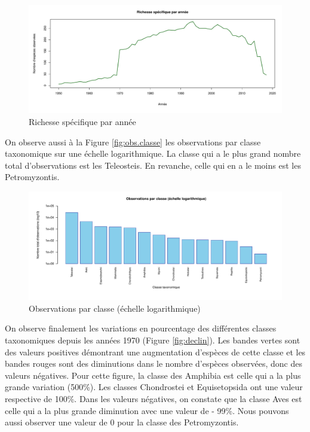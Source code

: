 \documentclass[9pt,twocolumn,twoside,]{pnas-new}
\begin{document}
\begin{figure}
\includegraphics[width=1\linewidth]{../figure_1_esp_par_annee} \caption{\label{fig:esp.annee} Richesse spécifique par année}\label{fig:fig.esp.annee}
\end{figure}

On observe aussi à la Figure \ref{fig:obs.classe} les observations par
classe taxonomique sur une échelle logarithmique. La classe qui a le
plus grand nombre total d'observations est les Teleosteis. En revanche,
celle qui en a le moins est les Petromyzontis.

\begin{figure}
\includegraphics[width=1\linewidth]{../figure_2_obs_par_classe} \caption{\label{fig:obs.classe} Observations par classe (échelle logarithmique)}\label{fig:fig.obs.classe}
\end{figure}

On observe finalement les variations en pourcentage des différentes
classes taxonomiques depuis les années 1970 (Figure \ref{fig:declin}).
Les bandes vertes sont des valeurs positives démontrant une augmentation
d'espèces de cette classe et les bandes rouges sont des diminutions dans
le nombre d'espèces observées, donc des valeurs négatives. Pour cette
figure, la classe des Amphibia est celle qui a la plus grande variation
(500\%). Les classes Chondrostei et Equisetopsida ont une valeur
respective de 100\%. Dans les valeurs négatives, on constate que la
classe Aves est celle qui a la plus grande diminution avec une valeur de
- 99\%. Nous pouvons aussi observer une valeur de 0 pour la classe des
Petromyzontis.
\end{document}
